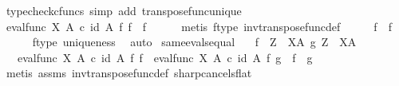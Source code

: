 \begin{isabellebody}
\ {\isacharparenleft}{\kern0pt}typecheck{\isacharunderscore}{\kern0pt}cfuncs{\isacharcomma}{\kern0pt}\ simp\ add{\isacharcolon}{\kern0pt}\ transpose{\isacharunderscore}{\kern0pt}func{\isacharunderscore}{\kern0pt}unique{\isacharparenright}{\kern0pt}\isanewline
\ \ \isamarkupfalse%
\ {\isachardoublequoteopen}eval{\isacharunderscore}{\kern0pt}func\ X\ A\ {\isasymcirc}\isactrlsub c\ {\isacharparenleft}{\kern0pt}id\ A\ {\isasymtimes}\isactrlsub f\ f{\isacharparenright}{\kern0pt}\ {\isacharequal}{\kern0pt}\ f\isactrlsup {\isasymflat}{\isachardoublequoteclose}\isanewline
\ \ \ \ \isamarkupfalse%
\ {\isacharparenleft}{\kern0pt}metis\ f{\isacharunderscore}{\kern0pt}type\ inv{\isacharunderscore}{\kern0pt}transpose{\isacharunderscore}{\kern0pt}func{\isacharunderscore}{\kern0pt}def{}{\isacharparenright}{\kern0pt}\isanewline
\ \ \isamarkupfalse%
\ \isamarkupfalse%
\ {\isachardoublequoteopen}f\isactrlsup {\isasymflat}\isactrlsup {\isasymsharp}\ {\isacharequal}{\kern0pt}\ f{\isachardoublequoteclose}\isanewline
\ \ \ \ \isamarkupfalse%
\ f{\isacharunderscore}{\kern0pt}type\ uniqueness\ \isamarkupfalse%
\ auto\isanewline
{}\isamarkupfalse%
%
\endisatagproof
{\isafoldproof}%
%
\isadelimproof
\isanewline
%
\endisadelimproof
\isanewline
{}\isamarkupfalse%
\ same{\isacharunderscore}{\kern0pt}evals{\isacharunderscore}{\kern0pt}equal{\isacharcolon}{\kern0pt}\isanewline
\ \ \ {\isachardoublequoteopen}f\ {\isacharcolon}{\kern0pt}\ Z\ {\isasymrightarrow}\ X\isactrlbsup A\isactrlesup {\isachardoublequoteclose}\ {\isachardoublequoteopen}g{\isacharcolon}{\kern0pt}\ Z\ {\isasymrightarrow}\ X\isactrlbsup A\isactrlesup {\isachardoublequoteclose}\isanewline
\ \ \ {\isachardoublequoteopen}eval{\isacharunderscore}{\kern0pt}func\ X\ A\ {\isasymcirc}\isactrlsub c\ {\isacharparenleft}{\kern0pt}id\ A\ {\isasymtimes}\isactrlsub f\ f{\isacharparenright}{\kern0pt}\ {\isacharequal}{\kern0pt}\ eval{\isacharunderscore}{\kern0pt}func\ X\ A\ {\isasymcirc}\isactrlsub c\ {\isacharparenleft}{\kern0pt}id\ A\ {\isasymtimes}\isactrlsub f\ g{\isacharparenright}{\kern0pt}\ {\isasymLongrightarrow}\ f\ {\isacharequal}{\kern0pt}\ g{\isachardoublequoteclose}\isanewline
%
\isadelimproof
\ \ %
\endisadelimproof
%
\isatagproof
{}\isamarkupfalse%
\ {\isacharparenleft}{\kern0pt}metis\ assms\ inv{\isacharunderscore}{\kern0pt}transpose{\isacharunderscore}{\kern0pt}func{\isacharunderscore}{\kern0pt}def{}\ sharp{\isacharunderscore}{\kern0pt}cancels{\isacharunderscore}{\kern0pt}flat{\isacharparenright}{\kern0pt}%

\end{isabellebody}

